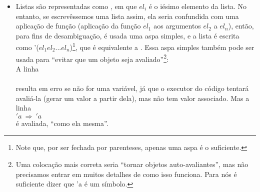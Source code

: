 \documentclass{article}
\begin{document}
\begin{itemize}
\item Listas são representadas como , em que $el_i$ é o iésimo elemento da lista. No entanto, se
  escrevêssemos uma lista assim, ela seria
  confundida com uma aplicação de função (aplicação da função $el_1$
  aos argumentos $el_2$ a $el_n$), então, para fins de
  desambiguação, é usada uma aspa simples, e a lista é escrita como
  '($el_1 el_2 ... el_n$)\footnote{Note que, por ser fechada por
    parenteses, apenas uma aspa é o suficiente.}, que é equivalente a  . Essa aspa simples também pode ser usada para
  ``evitar que um objeto seja avaliado''\footnote{Uma colocação mais
    correta seria ``tornar objetos auto-avaliantes'', mas não
    precisamos entrar em muitos detalhes de como isso funciona. Para
    nós é suficiente dizer que 'a é um símbolo.}:\\
  A linha\\
  \\
  resulta em erro se  não for uma variável, já que
  o executor do código tentará avaliá-la (gerar um valor a partir
  dela), mas \codigo{a} não tem valor associado. Mas a linha\\
  $'a\ \Rightarrow\ 'a$\\
  é avaliada, ``como ela mesma''.\\


\end{itemize}
\end{document}

